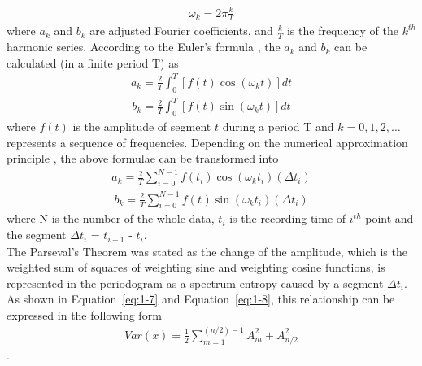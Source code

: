\documentclass[12pt,msc]{uom_eee_dissertation_casson}
\newcommand{\eqnref}[1]{Equation~\eqref{#1}}
\begin{document}
\begin{equation}
\label{eq:1-4}
\begin{aligned}
\omega_{k}=2\pi\frac{k}{T}
\end{aligned}
\end{equation}
where $a_{k}$ and $b_{k}$ are adjusted Fourier coefficients, and $\frac{k}{T}$ is the frequency of the $k^{th}$ harmonic series. According to the Euler's formula \citet[details shown as][pg.~12-15]{osgood2009fourier}, the $a_{k}$ and $b_{k}$ can be calculated (in a finite period T) as
\begin{equation}
\label{eq:1-5}
\begin{aligned}
a_{k}=\frac{2}{T}\int^{T}_{0}[f(t)\cos(\omega_{k}t)]dt
\end{aligned}
\end{equation}
\begin{equation}
\label{eq:1-6}
\begin{aligned}
b_{k}=\frac{2}{T}\int^{T}_{0}[f(t)\sin(\omega_{k}t)]dt
\end{aligned}
\end{equation}
where $f(t)$ is the amplitude of segment $t$ during a period T and $k=0, 1, 2, \dots$ represents a sequence of frequencies. Depending on the numerical approximation principle \citet[see ][ chap.4]{bloomfield2004fourier}, the above formulae can be transformed into
\begin{equation}
\label{eq:1-7}
\begin{aligned}
a_{k}=\frac{2}{T}\sum_{i=0}^{N-1}f(t_{i})\cos(\omega_{k}t_{i})(\Delta t_{i})
\end{aligned}
\end{equation}
\begin{equation}
\label{eq:1-8}
\begin{aligned}
b_{k}=\frac{2}{T}\sum_{i=0}^{N-1}f(t_{})\sin(\omega_{k}t_{i})(\Delta t_{i})
\end{aligned}
\end{equation}
where N is the number of the whole data, $t_{i}$ is the recording time of $i^{th}$ point and the segment $\Delta t_{i}$ = $t_{i+1}$ - $t_{i}$.\\

The Parseval's Theorem was stated as the change of the amplitude, which is the weighted sum of squares of weighting sine and weighting cosine functions, is represented in the periodogram as a spectrum entropy caused by a segment $\Delta t_{i}$. As shown in \eqnref{eq:1-7} and \eqnref{eq:1-8}, this relationship can be expressed in the following form
\begin{equation}
\label{eq:1-9}
\begin{aligned}
Var(x)=\frac{1}{2}\sum_{m=1}^{(n/2)-1}A_{m}^{2}+A_{n/2}^{2}
\end{aligned}
\end{equation}
\citep{bloomfield2004fourier}.
\end{document}

